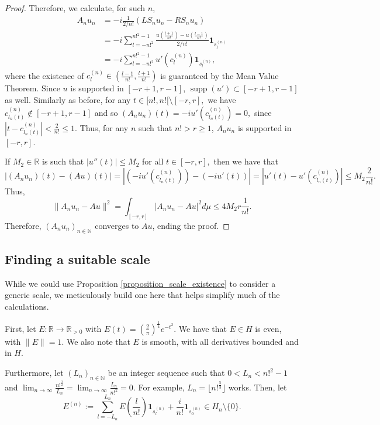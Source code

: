 \documentclass[10pt,a4paper]{amsart}
\begin{document}
\begin{proof}
	Therefore, we calculate, for such $n$,
	\begin{align*}
		A_nu_n &=-i\frac{1}{2/n!}(LS_n u_n-RS_n u_n)\\
		&=-i\sum_{l=-n!^2}^{n!^2-1}\frac{u(\frac{l+1}{n!})-u(\frac{l-1}{n!})}{2/n!}\mathbf{1}_{s_l^{(n)}}\\
		&=-i\sum_{l=-n!^2}^{n!^2-1} u'(c_l^{(n)})\mathbf{1}_{s_l^{(n)}},
	\end{align*}
	where the existence of $c_l^{(n)}\in(\frac{l-1}{n!},\frac{l+1}{n!})$ is guaranteed by the Mean Value Theorem. Since $u$ is supported in $[-r+1,r-1]$, $\operatorname{supp}(u')\subset [-r+1,r-1]$ as well. Similarly as before, for any $t\in[n!,n![\setminus [-r,r],$ we have $c_{l_n(t)}^{(n)}\notin[-r+1,r-1]$ and so $(A_nu_n)(t)=-iu'(c_{l_n(t)}^{(n)})=0,$  since $|t-c_{l_n(t)}^{(n)}|<\frac{2}{n!}\leq 1$. Thus, for any $n$ such that $n!> r\geq 1$, $A_nu_n$ is supported in $[-r,r].$
	
	If $M_2\in\mathbb{R}$ is such that $|u''(t)|\leq M_2$ for all $t\in[-r,r],$ then we have that $$|(A_nu_n)(t)-(Au)(t)|=|(-iu'(c_{l_n(t)}^{(n)}))- (-iu'(t))|=|u'(t)-u'(c_{l_n(t)}^{(n)})|\leq M_2\frac{2}{n!}.$$ Thus, $$\|A_nu_n-Au\|^2=\int_{[-r,r]}|A_nu_n-Au|^2d\mu\leq 4M_2r\frac{1}{n!}.$$ Therefore, $(A_n u_n)_{n\in\mathbb{N}}$ converges to $Au$, ending the proof.
\end{proof}

\subsection{Finding a suitable scale}\label{subsection_differential_scale} While we could use Proposition \ref{proposition_scale_existence} to consider a generic scale, we meticulously build one here that helps simplify much of the calculations.

First, let $E:\mathbb{R}\rightarrow\mathbb{R}_{>0}$ with $E(t)=\left(\frac{2}{\pi}\right)^{\frac{1}{4}}e^{-t^2}.$ We have that $E\in H$ is even, with $\|E\|=1.$ We also note that $E$ is smooth, with all derivatives bounded and in $H$. %

Furthermore, let $(L_n)_{n\in\mathbb{N}}$ be an integer sequence such that $0<L_n<n!^2-1$ and   $\lim_{n\rightarrow\infty}\frac{n!^{\frac{3}{2}}}{L_n}=\lim_{n\rightarrow\infty}\frac{L_n}{n!^2}=0.$ For example, $L_n=\lfloor n!^{\frac{5}{3}}\rfloor$ works. Then, let $$E^{(n)}:=\sum_{l=-L_n}^{L_n}E\left(\frac{l}{n!}\right)\mathbf{1}_{s_l^{(n)}}+\frac{i}{n!}\mathbf{1}_{s_0^{(n)}}\in H_n\setminus\{0\}.$$
\end{document}
